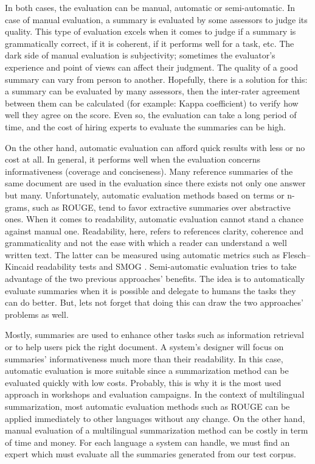 \documentclass[12pt, oneside, a4paper]{article}
\begin{document}
In both cases, the evaluation can be manual, automatic or semi-automatic. 
In case of manual evaluation, a summary is evaluated by some assessors to judge its quality. 
This type of evaluation excels when it comes to judge if a summary is grammatically correct, if it is coherent, if it performs well for a task, etc.
The dark side of manual evaluation is subjectivity; sometimes the evaluator's experience and point of views can affect their judgment. 
The quality of a good summary can vary from person to another.
Hopefully, there is a solution for this: a summary can be evaluated by many assessors, then the inter-rater agreement between them can be calculated (for example: Kappa coefficient) to verify how well they agree on the score.
Even so, the evaluation can take a long period of time, and the cost of hiring experts to evaluate the summaries can be high. 

On the other hand, automatic evaluation can afford quick results with less or no cost at all. 
In general, it performs well when the evaluation concerns informativeness (coverage and conciseness). 
Many reference summaries of the same document are used in the evaluation since there exists not only one answer but many.
Unfortunately, automatic evaluation methods based on terms or n-grams, such as ROUGE, tend to favor extractive summaries over abstractive ones.
When it comes to readability, automatic evaluation cannot stand a chance against manual one.
Readability, here, refers to references clarity, coherence and grammaticality and not the ease with which a reader can understand a well written text. 
The latter can be measured using automatic metrics such as Flesch–Kincaid readability tests \citep{75-kincaid-al} and SMOG \citep{69-laughlin-harry}.
Semi-automatic evaluation tries to take advantage of the two previous approaches' benefits. 
The idea is to automatically evaluate summaries when it is possible and delegate to humans the tasks they can do better.  
But, lets not forget that doing this can draw the two approaches' problems as well.


Mostly, summaries are used to enhance other tasks such as information retrieval or to help users pick the right document. 
A system's designer will focus on summaries' informativeness much more than their readability. 
In this case, automatic evaluation is more suitable since a summarization method can be evaluated quickly with low costs.
Probably, this is why it is the most used approach in workshops and evaluation campaigns. 
In the context of multilingual summarization, most automatic evaluation methods such as ROUGE can be applied immediately to other languages without any change.
On the other hand, manual evaluation of a multilingual summarization method can be costly in term of time and money. 
For each language a system can handle, we must find an expert which must evaluate all the summaries generated from our test corpus. 
\end{document}
